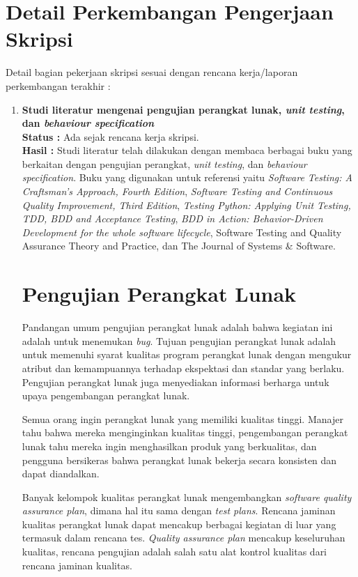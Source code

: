 \documentclass[a4paper,twoside]{article}
\begin{document}
\section{Detail Perkembangan Pengerjaan Skripsi}
Detail bagian pekerjaan skripsi sesuai dengan rencana kerja/laporan perkembangan terakhir :
	\begin{enumerate}
		\item \textbf{Studi literatur mengenai pengujian perangkat lunak, \textit{unit testing}, dan \textit{behaviour specification}}\\
		{\bf Status :} Ada sejak rencana kerja skripsi.\\
		{\bf Hasil :} Studi literatur telah dilakukan dengan membaca berbagai buku yang berkaitan dengan pengujian perangkat, \textit{unit testing}, dan \textit{behaviour specification}. Buku yang digunakan untuk referensi yaitu \textit{Software Testing: A Craftsman’s Approach, Fourth Edition}, \textit{Software Testing and Continuous Quality Improvement, Third Edition}, \textit{Testing Python: Applying Unit Testing, TDD, BDD and Acceptance Testing}, \textit{BDD in Action: Behavior-Driven Development for the whole software lifecycle}, Software Testing and Quality Assurance Theory and Practice, dan The Journal of Systems \& Software.
	
\section*{Pengujian Perangkat Lunak}	
Pandangan umum pengujian perangkat lunak adalah bahwa kegiatan ini adalah untuk menemukan \textit{bug}. Tujuan pengujian perangkat lunak adalah untuk memenuhi syarat kualitas program perangkat lunak dengan mengukur atribut dan kemampuannya terhadap ekspektasi dan standar yang berlaku. Pengujian perangkat lunak juga menyediakan informasi berharga untuk upaya pengembangan perangkat lunak.

Semua orang ingin perangkat lunak yang memiliki kualitas tinggi. Manajer tahu bahwa mereka menginginkan kualitas tinggi, pengembangan perangkat lunak tahu mereka ingin menghasilkan produk yang berkualitas, dan pengguna bersikeras bahwa perangkat lunak bekerja secara konsisten dan dapat diandalkan.

Banyak kelompok kualitas perangkat lunak mengembangkan \textit{software quality assurance plan}, dimana hal itu sama dengan \textit{test plans}. Rencana jaminan kualitas perangkat lunak dapat mencakup berbagai kegiatan di luar yang termasuk dalam rencana tes. \textit{Quality assurance plan} mencakup keseluruhan kualitas, rencana pengujian adalah salah satu alat kontrol kualitas dari rencana jaminan kualitas.


\end{enumerate}
\end{document}
